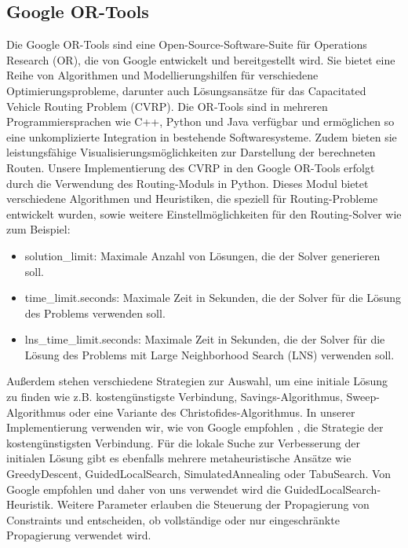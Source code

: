 \documentclass{IEEEtran}
\begin{document}
\subsection{Google OR-Tools}
Die Google OR-Tools \cite{GoogleORTools} sind eine Open-Source-Software-Suite für Operations 
Research (OR), die von Google entwickelt und bereitgestellt wird. Sie bietet eine Reihe von 
Algorithmen und Modellierungshilfen für verschiedene Optimierungsprobleme, darunter 
auch Lösungsansätze für das Capacitated Vehicle Routing Problem (CVRP). \newline\newline
Die OR-Tools sind in mehreren Programmiersprachen wie C++, Python und Java verfügbar und 
ermöglichen so eine unkomplizierte Integration in bestehende Softwaresysteme. Zudem bieten 
sie leistungsfähige Visualisierungsmöglichkeiten zur Darstellung der berechneten Routen.\newline\newline
Unsere Implementierung des CVRP in den Google OR-Tools erfolgt durch die Verwendung des 
Routing-Moduls \cite{GoogleCVRP} in Python. Dieses Modul bietet verschiedene Algorithmen und Heuristiken, 
die speziell für Routing-Probleme entwickelt wurden, sowie weitere Einstellmöglichkeiten
für den Routing-Solver wie zum Beispiel: 
\begin{itemize}
    \item{solution\_limit: Maximale Anzahl von Lösungen, die der Solver generieren soll.}
    \item{time\_limit.seconds: Maximale Zeit in Sekunden, die der Solver für die Lösung des Problems verwenden soll.}
    \item{lns\_time\_limit.seconds: Maximale Zeit in Sekunden, die der Solver für die Lösung des Problems mit Large Neighborhood Search (LNS) verwenden soll.}
\end{itemize}
Außerdem stehen verschiedene Strategien zur Auswahl, um eine initiale Lösung zu finden wie z.B. 
kostengünstigste Verbindung, Savings-Algorithmus, Sweep-Algorithmus oder eine Variante des 
Christofides-Algorithmus. In unserer Implementierung verwenden wir, wie von Google empfohlen \cite{GoogleCVRP},
die Strategie der kostengünstigsten Verbindung. \newline\newline
Für die lokale Suche zur Verbesserung der initialen Lösung gibt es ebenfalls mehrere metaheuristische 
Ansätze wie GreedyDescent, GuidedLocalSearch, SimulatedAnnealing oder TabuSearch. Von Google empfohlen
und daher von uns verwendet wird die GuidedLocalSearch-Heuristik. \newline\newline
Weitere Parameter erlauben die Steuerung der Propagierung von Constraints und entscheiden, 
ob vollständige oder nur eingeschränkte Propagierung verwendet wird.
\end{document}
